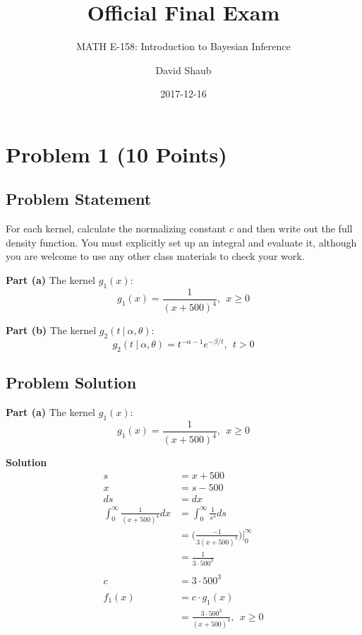 \documentclass[12pt]{article}
\title{Official Final Exam}
\author{MATH E-158: Introduction to Bayesian Inference}
\author{David Shaub}
\date{2017-12-16}
\theoremstyle{definition}
\begin{document}
	
	\maketitle


\section*{Problem 1 (10 Points)}


\subsection*{Problem Statement}

For each kernel, calculate the normalizing constant $c$ and then write out the full density function. You must explicitly set up an integral and evaluate it, although you are welcome to use any other class materials to check your work.

\bigskip
\noindent
{\bf Part (a)} The kernel $g_1(x)$:
$$
g_1(x) = \frac{1}{(x + 500)^4},\ \ x \geq 0
$$

\bigskip
\noindent
{\bf Part (b)} The kernel $g_2(t\ |\ \alpha, \theta)$:
$$
g_2(t\ |\ \alpha, \theta) = t^{-\alpha-1} e^{-\beta/t},\ \ t > 0
$$



\subsection*{Problem Solution}

\noindent
{\bf Part (a)} The kernel $g_1(x)$:
$$
g_1(x) = \frac{1}{(x + 500)^4},\ \ x \geq 0
$$

\bigskip
\noindent
{\bf Solution} 
\begin{align*}
s &= x + 500\\
x &= s - 500\\
ds &= dx\\
\int_0^\infty \frac{1}{(x + 500)^4}dx &= \int_0^\infty \frac{1}{s^4}ds\\
&= \biggr(\frac{-1}{3(x + 500)^3}\biggr)\biggr|_0^\infty\\
&= \frac{1}{3\cdot 500^3}\\\\
c &= 3\cdot 500^3\\\\
f_1(x) &= c \cdot g_1(x)\\
&= \frac{3\cdot500^3}{(x + 500)^4},\ \ x \geq 0
\end{align*}
\end{document}
